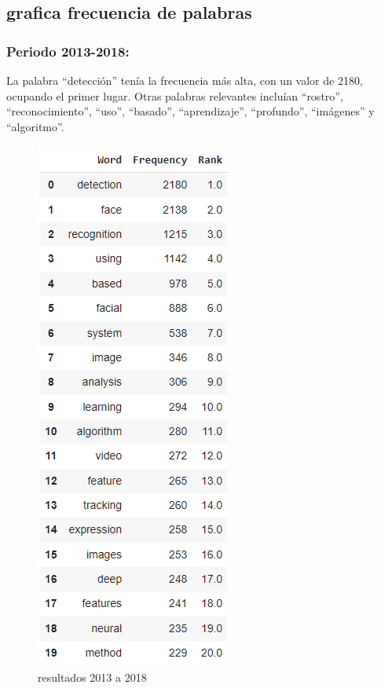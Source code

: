 \documentclass[conference]{IEEEtran}
\begin{document}
\subsection{grafica frecuencia de palabras}
\subsubsection{Periodo 2013-2018:}
La palabra “detección” tenía la frecuencia más alta, con un valor de 2180, ocupando el primer lugar.
Otras palabras relevantes incluían “rostro”, “reconocimiento”, “uso”, “basado”, “aprendizaje”, “profundo”, “imágenes” y “algoritmo”.
\begin{figure}[H]
    \centering
    \includegraphics[width=0.4\linewidth]{frecuenciapalabrastitulos2013.png}
    \caption{resultados 2013 a 2018}
    \label{fig:enter-label}
\end{figure}
\end{document}
